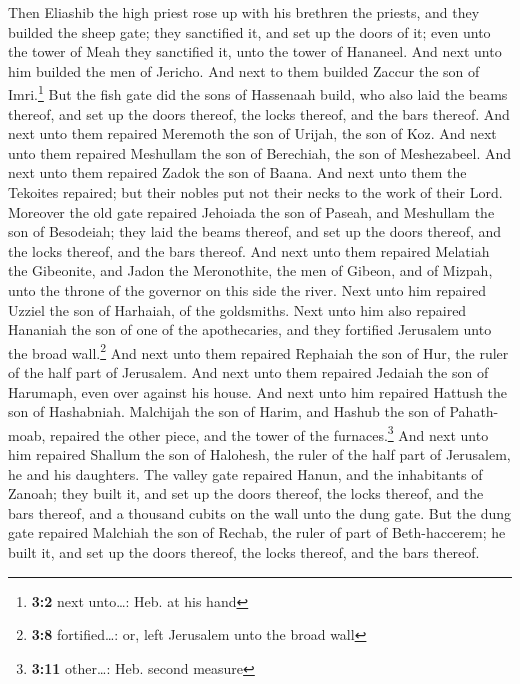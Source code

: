  Then Eliashib the high priest rose up with his brethren
the priests, and they builded the sheep gate; they sanctified it, and
set up the doors of it; even unto the tower of Meah they sanctified it,
unto the tower of Hananeel.  And next unto him builded the
men of Jericho. And next to them builded Zaccur the son of
Imri.\footnote{\textbf{3:2} next unto\ldots: Heb. at his hand}
 But the fish gate did the sons of Hassenaah build, who
also laid the beams thereof, and set up the doors thereof, the locks
thereof, and the bars thereof.  And next unto them
repaired Meremoth the son of Urijah, the son of Koz. And next unto them
repaired Meshullam the son of Berechiah, the son of Meshezabeel. And
next unto them repaired Zadok the son of Baana.  And next
unto them the Tekoites repaired; but their nobles put not their necks to
the work of their Lord.  Moreover the old gate repaired
Jehoiada the son of Paseah, and Meshullam the son of Besodeiah; they
laid the beams thereof, and set up the doors thereof, and the locks
thereof, and the bars thereof.  And next unto them
repaired Melatiah the Gibeonite, and Jadon the Meronothite, the men of
Gibeon, and of Mizpah, unto the throne of the governor on this side the
river.  Next unto him repaired Uzziel the son of Harhaiah,
of the goldsmiths. Next unto him also repaired Hananiah the son of one
of the apothecaries, and they fortified Jerusalem unto the broad
wall.\footnote{\textbf{3:8} fortified\ldots: or, left Jerusalem unto the
  broad wall}  And next unto them repaired Rephaiah the
son of Hur, the ruler of the half part of Jerusalem.  And
next unto them repaired Jedaiah the son of Harumaph, even over against
his house. And next unto him repaired Hattush the son of Hashabniah.
 Malchijah the son of Harim, and Hashub the son of
Pahath-moab, repaired the other piece, and the tower of the
furnaces.\footnote{\textbf{3:11} other\ldots: Heb. second measure}
 And next unto him repaired Shallum the son of Halohesh,
the ruler of the half part of Jerusalem, he and his daughters.
 The valley gate repaired Hanun, and the inhabitants of
Zanoah; they built it, and set up the doors thereof, the locks thereof,
and the bars thereof, and a thousand cubits on the wall unto the dung
gate.  But the dung gate repaired Malchiah the son of
Rechab, the ruler of part of Beth-haccerem; he built it, and set up the
doors thereof, the locks thereof, and the bars thereof. 

